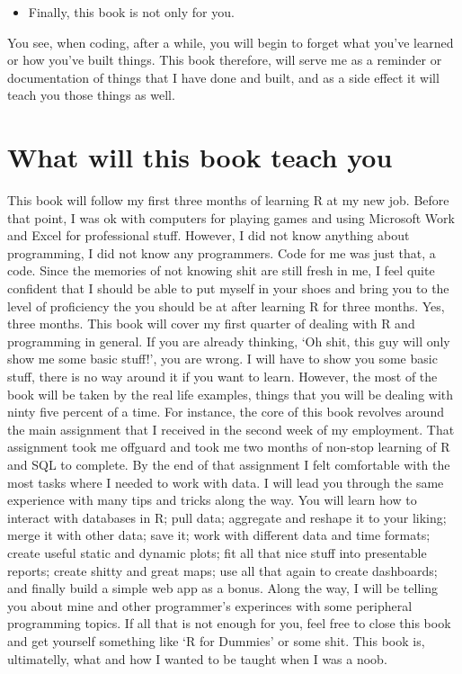 \documentclass[]{book}
\providecommand{\tightlist}{%
  \setlength{\itemsep}{0pt}\setlength{\parskip}{0pt}}
\begin{document}
\begin{itemize}
\tightlist
\item
  Finally, this book is not only for you.
\end{itemize}

You see, when coding, after a while, you will begin to forget what you've learned or how you've built things. This book therefore, will serve me as a reminder or documentation of things that I have done and built, and as a side effect it will teach you those things as well.

\hypertarget{what-will-this-book-teach-you}{%
\section{What will this book teach you}\label{what-will-this-book-teach-you}}

This book will follow my first three months of learning R at my new job. Before that point, I was ok with computers for playing games and using Microsoft Work and Excel for professional stuff. However, I did not know anything about programming, I did not know any programmers. Code for me was just that, a code. Since the memories of not knowing shit are still fresh in me, I feel quite confident that I should be able to put myself in your shoes and bring you to the level of proficiency the you should be at after learning R for three months. Yes, three months. This book will cover my first quarter of dealing with R and programming in general. If you are already thinking, `Oh shit, this guy will only show me some basic stuff!', you are wrong. I will have to show you some basic stuff, there is no way around it if you want to learn. However, the most of the book will be taken by the real life examples, things that you will be dealing with ninty five percent of a time. For instance, the core of this book revolves around the main assignment that I received in the second week of my employment. That assignment took me offguard and took me two months of non-stop learning of R and SQL to complete. By the end of that assignment I felt comfortable with the most tasks where I needed to work with data. I will lead you through the same experience with many tips and tricks along the way. You will learn how to interact with databases in R; pull data; aggregate and reshape it to your liking; merge it with other data; save it; work with different data and time formats; create useful static and dynamic plots; fit all that nice stuff into presentable reports; create shitty and great maps; use all that again to create dashboards; and finally build a simple web app as a bonus. Along the way, I will be telling you about mine and other programmer's experinces with some peripheral programming topics. If all that is not enough for you, feel free to close this book and get yourself something like `R for Dummies' or some shit. This book is, ultimatelly, what and how I wanted to be taught when I was a noob.
\end{document}
